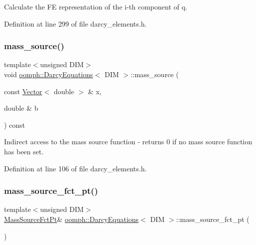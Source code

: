 Calculate the FE representation of the i-\/th component of q. 



Definition at line 299 of file darcy\+\_\+elements.\+h.

\mbox{\label{classoomph_1_1DarcyEquations_ae1074a981107175c6b5344003cb1fb85}} 
\subsubsection{\texorpdfstring{mass\+\_\+source()}{mass\_source()}}
{\footnotesize\ttfamily template$<$unsigned D\+IM$>$ \\
void \hyperlink{classoomph_1_1DarcyEquations}{oomph\+::\+Darcy\+Equations}$<$ D\+IM $>$\+::mass\+\_\+source (\begin{DoxyParamCaption}\item[{const \hyperlink{classoomph_1_1Vector}{Vector}$<$ double $>$ \&}]{x,  }\item[{double \&}]{b }\end{DoxyParamCaption}) const\hspace{0.3cm}{\ttfamily [inline]}}



Indirect access to the mass source function -\/ returns 0 if no mass source function has been set. 



Definition at line 106 of file darcy\+\_\+elements.\+h.

\mbox{\label{classoomph_1_1DarcyEquations_ac037d03df5b7530cf9048160a6601fd6}} 
\subsubsection{\texorpdfstring{mass\+\_\+source\+\_\+fct\+\_\+pt()}{mass\_source\_fct\_pt()}\hspace{0.1cm}{\footnotesize\ttfamily [1/2]}}
{\footnotesize\ttfamily template$<$unsigned D\+IM$>$ \\
\hyperlink{classoomph_1_1DarcyEquations_abb20685508a2704d195f3b8e124d20b4}{Mass\+Source\+Fct\+Pt}\& \hyperlink{classoomph_1_1DarcyEquations}{oomph\+::\+Darcy\+Equations}$<$ D\+IM $>$\+::mass\+\_\+source\+\_\+fct\+\_\+pt (\begin{DoxyParamCaption}{ }\end{DoxyParamCaption})\hspace{0.3cm}{\ttfamily [inline]}}



